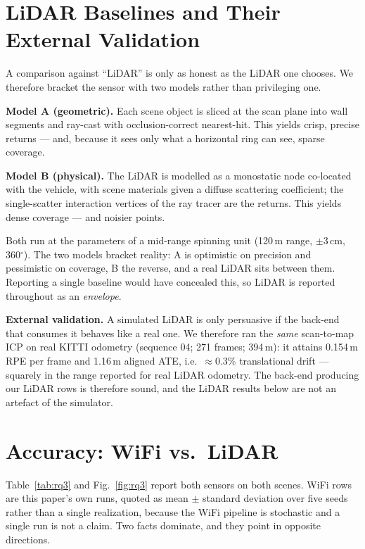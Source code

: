 \documentclass[journal]{IEEEtran}
\newcommand{\SI}[2]{#1\,#2}
\providecommand{\degree}{\ensuremath{^\circ}}
\begin{document}
\section{LiDAR Baselines and Their External Validation}\label{sec:lidar}

A comparison against ``LiDAR'' is only as honest as the LiDAR one chooses. We therefore
bracket the sensor with two models rather than privileging one.

\textbf{Model A (geometric).} Each scene object is sliced at the scan plane into wall
segments and ray-cast with occlusion-correct nearest-hit. This yields crisp, precise
returns --- and, because it sees only what a horizontal ring can see, sparse coverage.

\textbf{Model B (physical).} The LiDAR is modelled as a monostatic node co-located with
the vehicle, with scene materials given a diffuse scattering coefficient; the
single-scatter interaction vertices of the ray tracer are the returns. This yields dense
coverage --- and noisier points.

Both run at the parameters of a mid-range spinning unit (\SI{120}{m} range,
$\pm$\SI{3}{cm}, $360\degree$). The two models bracket reality: A is optimistic on
precision and pessimistic on coverage, B the reverse, and a real LiDAR sits between them.
Reporting a single baseline would have concealed this, so LiDAR is reported throughout as
an \emph{envelope}.

\textbf{External validation.} A simulated LiDAR is only persuasive if the back-end that
consumes it behaves like a real one. We therefore ran the \emph{same} scan-to-map ICP on
real KITTI odometry \cite{geiger2012kitti} (sequence 04; 271 frames; \SI{394}{m}):
it attains \SI{0.154}{m} RPE per frame and \SI{1.16}{m} aligned ATE, i.e.\ $\approx0.3\%$
translational drift --- squarely in the range reported for real LiDAR odometry. The
back-end producing our LiDAR rows is therefore sound, and the LiDAR results below are not
an artefact of the simulator.

\section{Accuracy: WiFi vs.\ LiDAR}\label{sec:accuracy}

Table~\ref{tab:rq3} and Fig.~\ref{fig:rq3} report both sensors on both scenes. WiFi rows are
this paper's own runs, quoted as mean $\pm$ standard deviation over five seeds rather than a
single realization, because the WiFi pipeline is stochastic and a single run is not a claim.
Two facts dominate, and they point in opposite directions.
\end{document}
